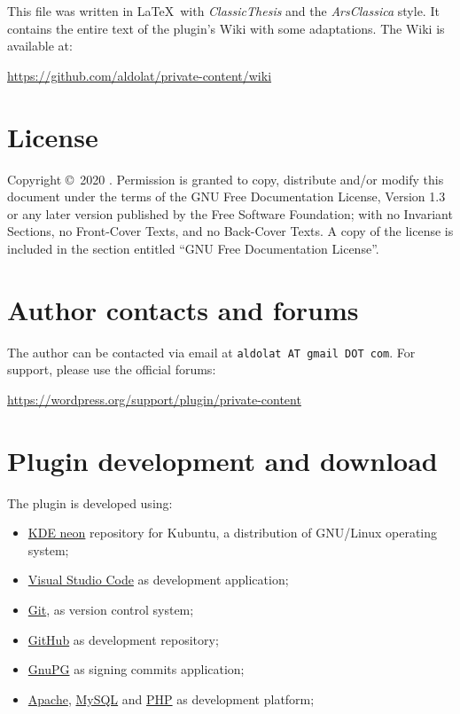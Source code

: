 \begingroup
	\footnotesize

	\noindent This file was written in \LaTeX~with \emph{ClassicThesis} and the
	\emph{ArsClassica} style. It contains the entire text of the plugin's Wiki
	with some adaptations. The Wiki is available at:

	\begin{center}
		\url{https://github.com/aldolat/private-content/wiki}
	\end{center}

	\vfill

	\section*{License}

	Copyright \copyright~2020 \myName.\newline
    \noindent Permission is granted to copy, distribute and/or modify this
    document under the terms of the GNU Free Documentation License, Version 1.3
    or any later version published by the Free Software Foundation; with no
    Invariant Sections, no Front-Cover Texts, and no Back-Cover Texts. A copy of
    the license is included in the section entitled ``GNU Free Documentation
	License''.

	\section*{Author contacts and forums}

	\noindent The author can be contacted via email at \texttt{aldolat AT gmail
	DOT com}.
	For support, please use the official forums:
	\begin{center}
	\url{https://wordpress.org/support/plugin/private-content}
	\end{center}
\endgroup

\newpage

\begingroup

	\footnotesize

	\section*{Plugin development and download}

	\noindent The plugin is developed using:

	\begin{itemize}
		\item \href{https://neon.kde.org/}{KDE neon} repository for Kubuntu, a
		distribution of GNU/Linux operating system;
		\item \href{https://code.visualstudio.com}{Visual Studio Code} as
		development application;
		\item \href{https://git-scm.com}{Git}, as version control system;
		\item \href{https://github.com/aldolat/private-content}{GitHub} as
		development repository;
		\item \href{https://gnupg.org}{GnuPG} as signing commits application;
		\item \href{http://apache.org/}{Apache},
		\href{https://www.mysql.com/it/}{MySQL} and
		\href{https://www.php.net/}{PHP} as development platform;
	\end{itemize}

